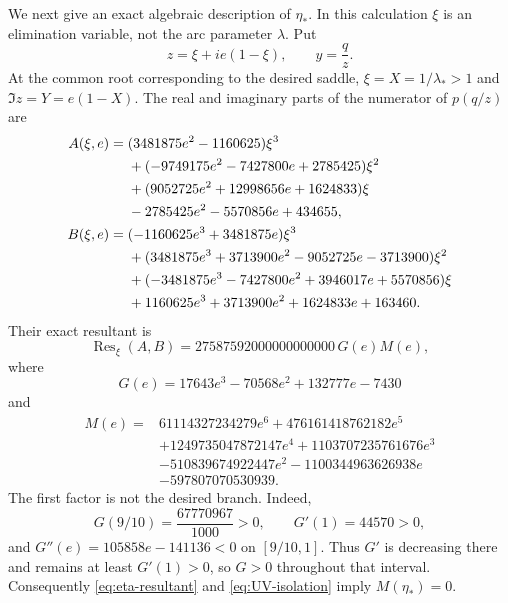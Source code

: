 \documentclass[11pt,reqno,letterpaper]{amsart}
\numberwithin{equation}{section}
\theoremstyle{definition}
\theoremstyle{remark}
\begin{document}
We next give an exact algebraic description of \(\eta_*\).  In this
calculation \(\xi\) is an elimination variable, not the arc parameter
\(\lambda\).  Put
\[
 z=\xi+ie(1-\xi),\qquad y=\frac qz.
\]
At the common root corresponding to the desired saddle,
\(\xi=X=1/\lambda_*>1\) and
\(\Im z=Y=e(1-X)\).  The real and imaginary parts of the numerator of
\(p(q/z)\) are
\begin{align}
 A(\xi,e)={}&(3481875e^2-1160625)\xi^3\notag\\
 &+(-9749175e^2-7427800e+2785425)\xi^2\notag\\
 &+(9052725e^2+12998656e+1624833)\xi\notag\\
 &-2785425e^2-5570856e+434655,\label{eq:elimination-A}\\
 B(\xi,e)={}&(-1160625e^3+3481875e)\xi^3\notag\\
 &+(3481875e^3+3713900e^2-9052725e-3713900)\xi^2\notag\\
 &+(-3481875e^3-7427800e^2+3946017e+5570856)\xi\notag\\
 &+1160625e^3+3713900e^2+1624833e+163460.
 \label{eq:elimination-B}
\end{align}
Their exact resultant is
\begin{equation}\label{eq:eta-resultant}
 \operatorname{Res}_{\xi}(A,B)
 =27587592000000000000\,G(e)M(e),
\end{equation}
where
\[
 G(e)=17643e^3-70568e^2+132777e-7430
\]
and
\begin{equation}\label{eq:eta-sextic}
 \boxed{\begin{aligned}
 M(e)={}&61114327234279e^6+476161418762182e^5\\
 &+1249735047872147e^4+1103707235761676e^3\\
 &-510839674922447e^2-1100344963626938e\\
 &-597807070530939.
 \end{aligned}}
\end{equation}
The first factor is not the desired branch.  Indeed,
\[
 G(9/10)=\frac{67770967}{1000}>0,\qquad
 G'(1)=44570>0,
\]
and \(G''(e)=105858e-141136<0\) on \([9/10,1]\).  Thus \(G'\) is
decreasing there and remains at least \(G'(1)>0\), so \(G>0\) throughout
that interval.  Consequently \eqref{eq:eta-resultant} and
\eqref{eq:UV-isolation} imply \(M(\eta_*)=0\).
\end{document}
